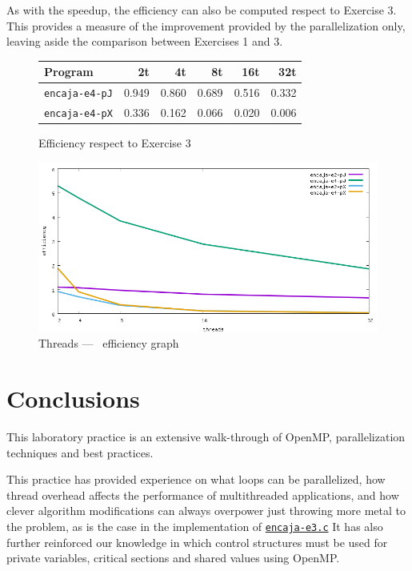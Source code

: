 \documentclass[a4paper]{article}
\newcommand{\github}{https://github.com/kauron/etsinf3/tree/master/CPA/lab2}
\newcommand{\gitline}[2]{\texttt{\href{\github /src/#1#2}{#1}}}
\begin{document}
As with the speedup, the efficiency can also be computed respect to Exercise 3. This provides a measure of the improvement provided by the parallelization only, leaving aside the comparison between Exercises 1 and 3.

\begin{figure}[h]
    \centering
    \begin{tabular}{l r r r r r}
        Program               & 2t    & 4t    & 8t    & 16t   & 32t   \\ \hline
        \texttt{encaja-e4-pJ} & 0.949 & 0.860 & 0.689 & 0.516 & 0.332 \\
        \texttt{encaja-e4-pX} & 0.336 & 0.162 & 0.066 & 0.020 & 0.006 \\ \hline
    \end{tabular}
    \caption{Efficiency respect to Exercise 3}
    \label{fig:table-efficiencyR3}
\end{figure}

\begin{figure}[h]
    \centering
    \includegraphics[width=\textwidth]{../img/efficiency}
    \caption{Threads --- \unskip \, efficiency graph}
    \label{fig:graph-efficiency}
\end{figure}
\newpage

\section{Conclusions}
This laboratory practice is an extensive walk-through of OpenMP, parallelization techniques and best practices.

This practice has provided experience on what loops can be parallelized, how thread overhead affects the performance of multithreaded applications, and how clever algorithm modifications can always overpower just throwing more metal to the problem, as is the case in the implementation of \gitline{encaja-e3.c}. It has also further reinforced our knowledge in which control structures must be used for private variables, critical sections and shared values using OpenMP.
\end{document}
